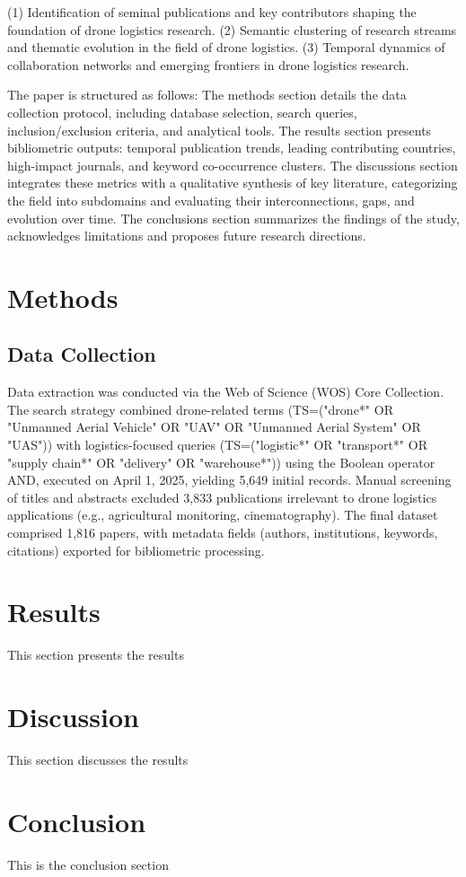 \documentclass{article}
\begin{document}
(1) Identification of seminal publications and key contributors shaping the foundation of drone logistics research.
(2) Semantic clustering of research streams and thematic evolution in the field of drone logistics.
(3) Temporal dynamics of collaboration networks and emerging frontiers in drone logistics research.

The paper is structured as follows: The methods section details the data collection protocol, including database selection, search queries, inclusion/exclusion criteria, and analytical tools. The results section presents bibliometric outputs: temporal publication trends, leading contributing countries, high-impact journals, and keyword co-occurrence clusters. The discussions section integrates these metrics with a qualitative synthesis of key literature, categorizing the field into subdomains and evaluating their interconnections, gaps, and evolution over time. The conclusions section summarizes the findings of the study, acknowledges limitations and proposes future research directions.




\section{Methods}
\subsection{Data Collection} %
Data extraction was conducted via the Web of Science (WOS) Core Collection. The search strategy combined drone-related terms (TS=("drone*" OR "Unmanned Aerial Vehicle" OR "UAV" OR "Unmanned Aerial System" OR "UAS")) with logistics-focused queries (TS=("logistic*" OR "transport*" OR "supply chain*" OR "delivery" OR "warehouse*")) using the Boolean operator AND, executed on April 1, 2025, yielding 5,649 initial records. Manual screening of titles and abstracts excluded 3,833 publications irrelevant to drone logistics applications (e.g., agricultural monitoring, cinematography). The final dataset comprised 1,816 papers, with metadata fields (authors, institutions, keywords, citations) exported for bibliometric processing.

\section{Results}
This section presents the results

\section{Discussion}
This section discusses the results

\section{Conclusion}
This is the conclusion section

\printbibliography
\end{document}
